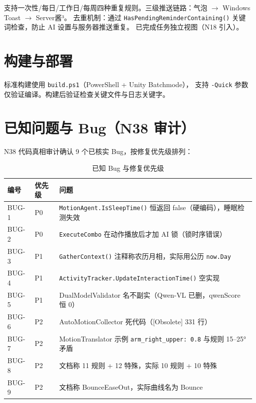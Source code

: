 \documentclass[12pt,a4paper]{ctexart}
\begin{document}
支持一次性/每日/工作日/每周四种重复规则。三级推送链路：气泡 $\rightarrow$ Windows Toast $\rightarrow$ Server酱³。
去重机制：通过 \texttt{HasPendingReminderContaining()} 关键词检查，防止 AI 设置与服务器推送重复。
已完成任务独立视图（N18 引入）。

\section{构建与部署}

标准构建使用 \texttt{build.ps1}（PowerShell + Unity Batchmode），
支持 \texttt{-Quick} 参数仅验证编译。构建后验证检查关键文件与日志关键字。

\section{已知问题与 Bug（N38 审计）}

N38 代码真相审计确认 9 个已核实 Bug，按修复优先级排列：

\begin{table}[H]
\centering
\caption{已知 Bug 与修复优先级}
\label{tab:bugs}
\begin{tabular}{llp{8cm}}
\toprule
\textbf{编号} & \textbf{优先级} & \textbf{问题} \\
\midrule
BUG-1 & P0 & \texttt{MotionAgent.IsSleepTime()} 恒返回 false（硬编码），睡眠检测失效 \\
BUG-2 & P0 & \texttt{ExecuteCombo} 在动作播放后才加 AI 锁（锁时序错误） \\
BUG-3 & P1 & \texttt{GatherContext()} 注释称农历月相，实际用公历 \texttt{now.Day} \\
BUG-4 & P1 & \texttt{ActivityTracker.UpdateInteractionTime()} 空实现 \\
BUG-5 & P1 & DualModelValidator 名不副实（Qwen-VL 已删，qwenScore 恒 0） \\
BUG-6 & P2 & AutoMotionCollector 死代码（[Obsolete] 331 行） \\
BUG-7 & P2 & MotionTranslator 示例 \texttt{arm\_right\_upper: 0.8} 与规则 15--25° 矛盾 \\
BUG-8 & P2 & 文档称 11 规则 + 12 特殊，实际 10 规则 + 10 特殊 \\
BUG-9 & P2 & 文档称 BounceEaseOut，实际曲线名为 Bounce \\
\bottomrule
\end{tabular}
\end{table}
\end{document}
